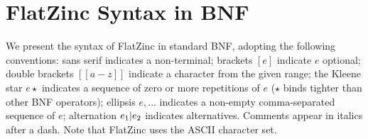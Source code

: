 \documentclass[a4paper]{article}
\begin{document}
\newpage

\section{FlatZinc Syntax in BNF}
\label{Syntax}

We present the syntax of FlatZinc in standard BNF, adopting the
following conventions:
sans serif  indicates a non-terminal;
brackets $[e]$ indicate $e$ optional;
double brackets $[[a-z]]$ indicate a character from the given range;
the Kleene star $e\star$ indicates a sequence of zero or more
repetitions of $e$ ($\star$ binds tighter than other BNF operators);
ellipsis $e, \ldots$ indicates a non-empty comma-separated sequence
of $e$;
alternation $e_1 \mathsf{|} e_2$ indicates alternatives.
Comments appear in italics after a dash.
Note that FlatZinc uses the ASCII character set.
\end{document}
